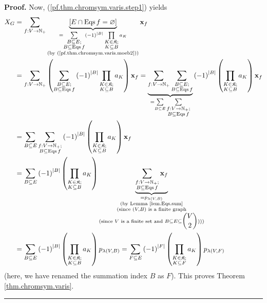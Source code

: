 \documentclass[numbers=enddot,12pt,final,onecolumn,notitlepage]{scrartcl}%
\theoremstyle{definition}
\newenvironment{proof}[1][Proof]{\noindent\textbf{#1.} }{\ \rule{0.5em}{0.5em}}
\newenvironment{verlong}{}{}
\let\sumnonlimits\sum
\let\prodnonlimits\prod
\renewcommand{\sum}{\sumnonlimits\limits}
\renewcommand{\prod}{\prodnonlimits\limits}
\begin{document}
\begin{verlong}
\begin{proof}
Now, (\ref{pf.thm.chromsym.varis.step1}) yields%
\begin{align*}
X_{G}  &  =\sum_{f:V\rightarrow\mathbb{N}_{+}}\underbrace{\left[
E\cap\operatorname*{Eqs}f=\varnothing\right]  }_{\substack{=\sum
_{\substack{B\subseteq E;\\B\subseteq\operatorname*{Eqs}f}}\left(  -1\right)
^{\left\vert B\right\vert }\prod_{\substack{K\in\mathfrak{K};\\K\subseteq
B}}a_{K}\\\text{(by (\ref{pf.thm.chromsym.varis.moeb2}))}}}\mathbf{x}_{f}\\
&  =\sum_{f:V\rightarrow\mathbb{N}_{+}}\left(  \sum_{\substack{B\subseteq
E;\\B\subseteq\operatorname*{Eqs}f}}\left(  -1\right)  ^{\left\vert
B\right\vert }\prod_{\substack{K\in\mathfrak{K};\\K\subseteq B}}a_{K}\right)
\mathbf{x}_{f}=\underbrace{\sum_{f:V\rightarrow\mathbb{N}_{+}}\sum
_{\substack{B\subseteq E;\\B\subseteq\operatorname*{Eqs}f}}}_{=\sum
_{B\subseteq E}\sum_{\substack{f:V\rightarrow\mathbb{N}_{+};\\B\subseteq
\operatorname*{Eqs}f}}}\left(  -1\right)  ^{\left\vert B\right\vert }\left(
\prod_{\substack{K\in\mathfrak{K};\\K\subseteq B}}a_{K}\right)  \mathbf{x}%
_{f}\\
&  =\sum_{B\subseteq E}\sum_{\substack{f:V\rightarrow\mathbb{N}_{+}%
;\\B\subseteq\operatorname*{Eqs}f}}\left(  -1\right)  ^{\left\vert
B\right\vert }\left(  \prod_{\substack{K\in\mathfrak{K};\\K\subseteq B}%
}a_{K}\right)  \mathbf{x}_{f}\\
&  =\sum_{B\subseteq E}\left(  -1\right)  ^{\left\vert B\right\vert }\left(
\prod_{\substack{K\in\mathfrak{K};\\K\subseteq B}}a_{K}\right)
\underbrace{\sum_{\substack{f:V\rightarrow\mathbb{N}_{+};\\B\subseteq
\operatorname*{Eqs}f}}\mathbf{x}_{f}}_{\substack{=p_{\lambda\left(
V,B\right)  }\\\text{(by Lemma \ref{lem.Eqs.sum}}\\\text{(since }\left(
V,B\right)  \text{ is a finite graph}\\\text{(since }V\text{ is a finite set
and }B\subseteq E\subseteq\dbinom{V}{2}\text{)))}}}\\
&  =\sum_{B\subseteq E}\left(  -1\right)  ^{\left\vert B\right\vert }\left(
\prod_{\substack{K\in\mathfrak{K};\\K\subseteq B}}a_{K}\right)  p_{\lambda
\left(  V,B\right)  }=\sum_{F\subseteq E}\left(  -1\right)  ^{\left\vert
F\right\vert }\left(  \prod_{\substack{K\in\mathfrak{K};\\K\subseteq F}%
}a_{K}\right)  p_{\lambda\left(  V,F\right)  }%
\end{align*}
(here, we have renamed the summation index $B$ as $F$). This proves Theorem
\ref{thm.chromsym.varis}.
\end{proof}
\end{verlong}
\end{document}
